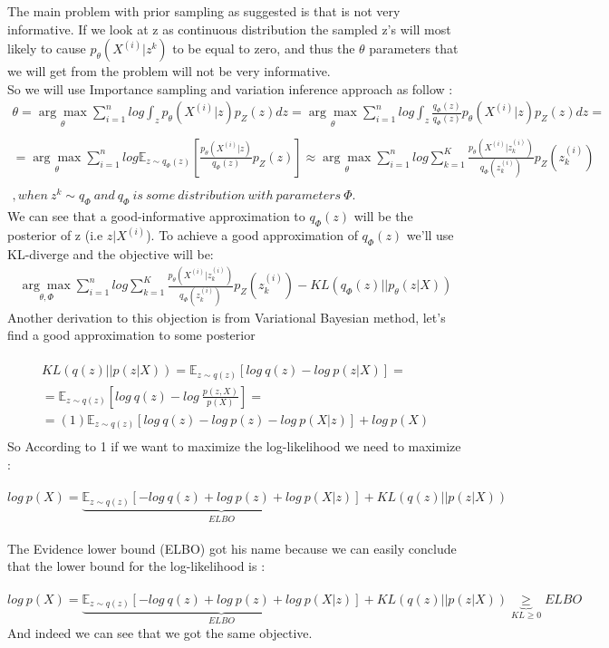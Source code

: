 The main problem with prior sampling as suggested is that is not very informative. If we look at z as continuous distribution the sampled z's will most likely to cause $p_{\theta}(X^{(i)}|z^{k})$ to be equal to zero, and thus the $\theta$ parameters that we will get from the problem will not be very informative. \\ So we will use Importance sampling and variation inference approach as follow : 
\begin{gather*}
\theta=\underset{\theta}{\arg\max} \sum_{i=1}^{n}log \int_z p_{\theta}(X^{(i)}|z)p_{Z}(z)dz = \underset{\theta}{\arg\max} \sum_{i=1}^{n}log \int_z \frac{q_{\Phi}(z)}{q_{\Phi}(z)}p_{\theta}(X^{(i)}|z)p_{Z}(z)dz= \\ \\ = \underset{\theta}{\arg\max} \sum_{i=1}^{n}log \mathbb{E}_{z \sim q_{\Phi}(z)}[\frac{p_{\theta}(X^{(i)}|z)}{q_{\Phi}(z)}p_{Z}(z)] \approx \underset{\theta}{\arg\max} \sum_{i=1}^{n}log \sum_{k=1}^{K}\frac{p_{\theta}(X^{(i)}|z_{k}^{(i)})}{q_{\Phi}(z_{k}^{(i)})}p_{Z}(z_{k}^{(i)}) \\ \\ , when\ z^{k}\sim q_{\Phi} \ and \ q_{\Phi} \ is \ some \ distribution \ with \ parameters \ \Phi.
\end{gather*}
We can see that a good-informative approximation to $q_{\Phi}(z)$ will be the posterior of z (i.e $z|X^{(i)}$). To achieve a good approximation of $q_{\Phi}(z)$ we'll use KL-diverge and the objective will be: 
\begin{gather*}
\underset{\theta,\Phi}{\arg\max} \sum_{i=1}^{n}log \sum_{k=1}^{K}\frac{p_{\theta}(X^{(i)}|z_{k}^{(i)})}{q_{\Phi}(z_{k}^{(i)})}p_{Z}(z_{k}^{(i)}) - KL(q_{\Phi}(z)||p_{\theta}(z|X))
\end{gather*}
Another derivation to this objection is from Variational Bayesian method, let's find a good approximation to some posterior\\ \\
\begin{gather*}
KL(q(z)||p(z|X))=\mathbb{E}_{z \sim q(z)}[log \ q(z)-log \ p(z|X)] = \\  
= \mathbb{E}_{z \sim q(z)}[log \ q(z) - log \ \frac{p(z,X)}{p(X)}] = \\ 
=(1) \mathbb{E}_{z \sim q(z)}[log \ q(z) - log \ p(z) - log \ p(X|z)] + log \ p(X) \\ 
\end{gather*}
So According to 1 if we want to maximize the log-likelihood we need to maximize : \\ \\
$log \ p(X) = \underbrace{\mathbb{E}_{z \sim q(z)}[-log \ q(z) + log \ p(z) + log \ p(X|z)]}_{ELBO}+KL(q(z)||p(z|X))$ \\ \\
The Evidence lower bound (ELBO) got his name because we can easily conclude that the lower bound for the log-likelihood is : \\ \\
$log \ p(X) = \underbrace{\mathbb{E}_{z \sim q(z)}[-log \ q(z) + log \ p(z) + log \ p(X|z)]}_{ELBO}+KL(q(z)||p(z|X)) \underbrace{\geq}_{KL \geq 0} ELBO $ \\ And indeed we can see that we got the same objective.
